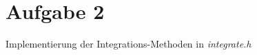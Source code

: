 \section{Aufgabe 2}
\label{sec:A2}
Implementierung der Integrations-Methoden in \textit{integrate.h}